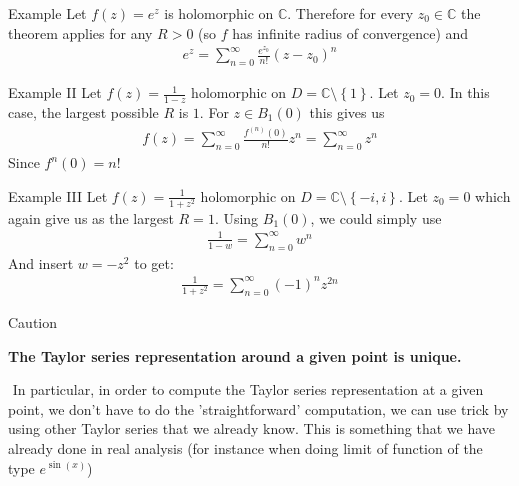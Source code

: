	\begin{parag}{Example}
		Let $f\left(z\right) = e^{z}$ is holomorphic on $\mathbb{C}$. Therefore for every $z_0 \in \mathbb{C}$ the theorem applies for any $R > 0$ (so $f$ has infinite radius of convergence) and 
		\begin{align*} e^{z} =  \sum_{n = 0}^{\infty}\frac{e^{z_0}}{n!}\left(z - z_0\right)^{n} \end{align*}
	\end{parag}
	\begin{parag}{Example II}
	    Let $f\left(z\right) =  \frac{1}{1 - z}$ holomorphic on $D =  \mathbb{C}\setminus \left\{1\right\}$. Let $z_0 = 0$. In this case, the largest possible $R$ is $1$. For $z \in B_1\left(0\right)$ this gives us 
		\begin{align*} 
			f\left(z\right) = \sum_{n = 0}^{\infty}\frac{f^{\left(n\right)}\left(0\right)}{n!}z^{n} =  \sum_{n = 0}^{\infty}z^{n}
		\end{align*}
		Since $f^{n}\left(0\right) =  n!$
	\end{parag}
	\begin{parag}{Example III}
	    Let $f\left(z\right) = \frac{1}{1 + z^2}$ holomorphic on $D = \mathbb{C}\setminus \left\{-i, i\right\}$. Let $z_0 = 0$ which again give us as the largest $R = 1$. Using $B_1\left(0\right)$, we could simply use 
		\begin{align*} 
			\frac{1}{1 - w} = \sum_{n= 0}^{\infty}w^{n}
		\end{align*}
		And insert $w =  -z^2$ to get:
		\begin{align*} 
			\frac{1}{1 + z^2} =  \sum_{n = 0}^{\infty}\left(-1\right)^{n}z^{2n}
		\end{align*}
	\end{parag}
	
	
	

\begin{parag}{Caution}
\end{parag}
\begin{center}
    \textbf{The Taylor series representation around a given point is unique.}
\end{center}
\begin{parag}{$ $}
    In particular, in order to compute the Taylor series representation at a given point, we don't have to do the 'straightforward' computation, we can use trick by using other Taylor series that we already know. This is something that we have already done in real analysis (for instance when doing limit of function of the type $e^{\sin\left(x\right)}$)
\end{parag}

